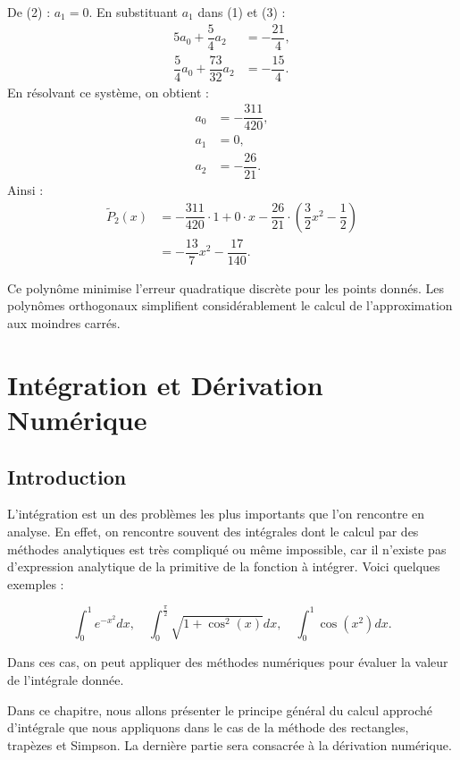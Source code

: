 De (2) : $a_1 = 0$.
En substituant $a_1$ dans (1) et (3) :
\begin{align*}
5a_0 + \dfrac{5}{4}a_2 &= -\dfrac{21}{4}, \\
\dfrac{5}{4}a_0 + \dfrac{73}{32}a_2 &= -\dfrac{15}{4}.
\end{align*}
En résolvant ce système, on obtient :
\begin{align*}
a_0 &= -\dfrac{311}{420}, \\
a_1 &= 0, \\
a_2 &= -\dfrac{26}{21}.
\end{align*}
Ainsi :
\begin{align*}
\tilde{P}_2(x) &= -\dfrac{311}{420} \cdot 1 + 0 \cdot x - \dfrac{26}{21} \cdot \left(\dfrac{3}{2}x^2 - \dfrac{1}{2}\right) \\
&= -\dfrac{13}{7}x^2 - \dfrac{17}{140}.
\end{align*}

Ce polynôme minimise l'erreur quadratique discrète pour les points donnés. Les polynômes orthogonaux simplifient considérablement le calcul de l'approximation aux moindres carrés.
\chapter{Intégration et Dérivation Numérique}
\section{Introduction}
L'intégration est un des problèmes les plus importants que l'on rencontre en analyse. En effet, on rencontre souvent des intégrales dont le calcul par des méthodes analytiques est très compliqué ou même impossible, car il n'existe pas d'expression analytique de la primitive de la fonction à intégrer. Voici quelques exemples :

\[
\displaystyle\int_{0}^{1} e^{-x^2} dx, \quad \displaystyle\int_{0}^{\frac{\pi}{2}} \sqrt{1 + \cos^2(x)} dx, \quad \displaystyle\int_{0}^{1} \cos(x^2) dx.
\]

Dans ces cas, on peut appliquer des méthodes numériques pour évaluer la valeur de l'intégrale donnée.

Dans ce chapitre, nous allons présenter le principe général du calcul approché d'intégrale que nous appliquons dans le cas de la méthode des rectangles, trapèzes et Simpson. La dernière partie sera consacrée à la dérivation numérique.

